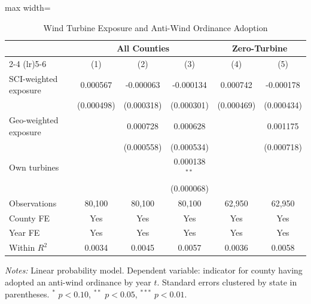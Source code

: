 \begin{table}[htbp]
\centering
\caption{Wind Turbine Exposure and Anti-Wind Ordinance Adoption}
\label{tab:main}
\begin{adjustbox}{max width=\textwidth}
\begin{threeparttable}
\begin{tabular}{lccccc}
\toprule
 & \multicolumn{3}{c}{All Counties} & \multicolumn{2}{c}{Zero-Turbine} \\
\cmidrule(lr){2-4} \cmidrule(lr){5-6}
 & (1) & (2) & (3) & (4) & (5) \\
\midrule
SCI-weighted exposure & 0.000567 & -0.000063 & -0.000134 & 0.000742 & -0.000178 \\
 & (0.000498) & (0.000318) & (0.000301) & (0.000469) & (0.000434) \\
\addlinespace
Geo-weighted exposure &  & 0.000728 & 0.000628 &  & 0.001175 \\
 &  & (0.000558) & (0.000534) &  & (0.000718) \\
\addlinespace
Own turbines &  &  & 0.000138$^{**}$ &  &  \\
 &  &  & (0.000068) &  &  \\
\midrule
Observations & 80,100 & 80,100 & 80,100 & 62,950 & 62,950 \\
County FE & Yes & Yes & Yes & Yes & Yes \\
Year FE & Yes & Yes & Yes & Yes & Yes \\
Within $R^2$ & 0.0034 & 0.0045 & 0.0057 & 0.0036 & 0.0058 \\
\bottomrule
\end{tabular}
\begin{tablenotes}[flushleft]
\small
\item \textit{Notes:} Linear probability model. Dependent variable: indicator for county having adopted an anti-wind ordinance by year $t$. Standard errors clustered by state in parentheses. $^{*}$ $p<0.10$, $^{**}$ $p<0.05$, $^{***}$ $p<0.01$.
\end{tablenotes}
\end{threeparttable}
\end{adjustbox}
\end{table}
